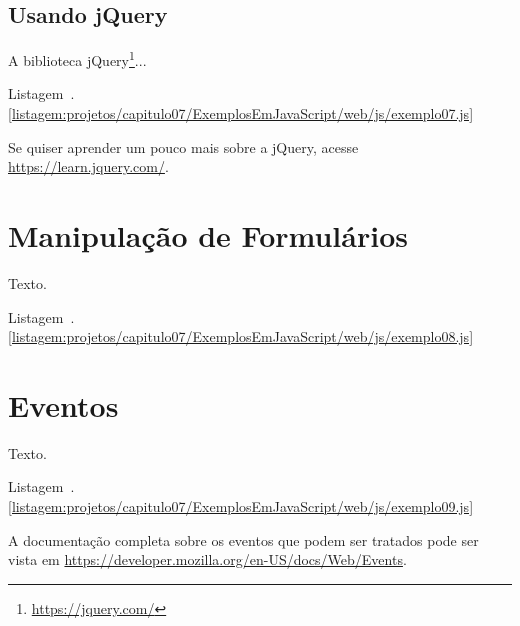 

\subsection{Usando jQuery}

A biblioteca jQuery\footnote{\url{https://jquery.com/}}...

Listagem~\thechapter.\ref{listagem:projetos/capitulo07/ExemplosEmJavaScript/web/js/exemplo07.js}


\begin{saibaMais}
    Se quiser aprender um pouco mais sobre a jQuery, acesse \url{https://learn.jquery.com/}.
\end{saibaMais}


\section{Manipulação de Formulários}

Texto.

Listagem~\thechapter.\ref{listagem:projetos/capitulo07/ExemplosEmJavaScript/web/js/exemplo08.js}



\section{Eventos}

Texto.

Listagem~\thechapter.\ref{listagem:projetos/capitulo07/ExemplosEmJavaScript/web/js/exemplo09.js}


\begin{saibaMais}
    A documentação completa sobre os eventos que podem ser tratados pode ser vista em  \url{https://developer.mozilla.org/en-US/docs/Web/Events}.
\end{saibaMais}



